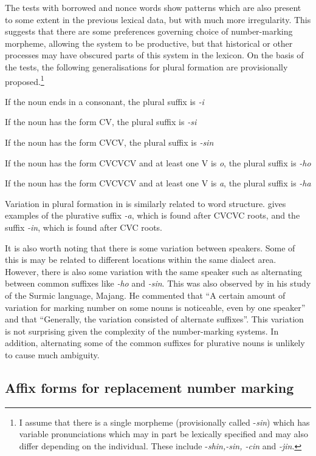 \documentclass[output=paper]{langsci/langscibook}
\begin{document}
The tests with borrowed and nonce words show patterns which are also present to some extent in the previous lexical data, but with much more irregularity. This suggests that there are some preferences governing choice of number-marking morpheme, allowing the system to be productive, but that historical or other processes may have obscured parts of this system in the  lexicon. On the basis of the tests, the following generalisations for plural formation are provisionally proposed.\footnote{I assume that there is a single morpheme (provisionally called -\textit{sin}) which has variable pronunciations which may in part be lexically specified and may also differ depending on the individual. These include -\textit{shin,-sin, -cin }and \textit{-jin}.}

\ea\label{ex:moodie:3} If the noun ends in a consonant, the plural suffix is \textit{-i}

If the noun has the form CV, the plural suffix is \textit{-si} 

If the noun has the form CVCV, the plural suffix is \textit{-sin} 

If the noun has the form CVCVCV and at least one V is\textit{ o}, the plural suffix is \textit{-ho} 

If the noun has the form CVCVCV and at least one V is \textit{a}, the plural suffix is \textit{-ha} 
\z

Variation in plural formation in  is similarly related to word structure. \citet[235]{Dimmendaal2000} gives examples of the plurative suffix \textit{-a}, which is found after CVCVC roots, and the suffix \textit{-in}, which is found after CVC roots. 

It is also worth noting that there is some variation between speakers. Some of this is may be related to different locations within the same dialect area. However, there is also some variation with the same speaker such as alternating between common suffixes like \textit{-ho} and \textit{-sin}. This was also observed by \citet[76]{Unseth1988} in his study of the  Surmic language, Majang. He commented that “A certain amount of variation for marking number on some nouns is noticeable, even by one speaker” and that “Generally, the variation consisted of alternate suffixes”. This variation is not surprising given the complexity of the number-marking systems. In addition, alternating some of the common suffixes for plurative nouns is unlikely to cause much ambiguity.

\subsection{Affix forms for replacement number marking} \label{sec:moodie:4.3}
\end{document}
